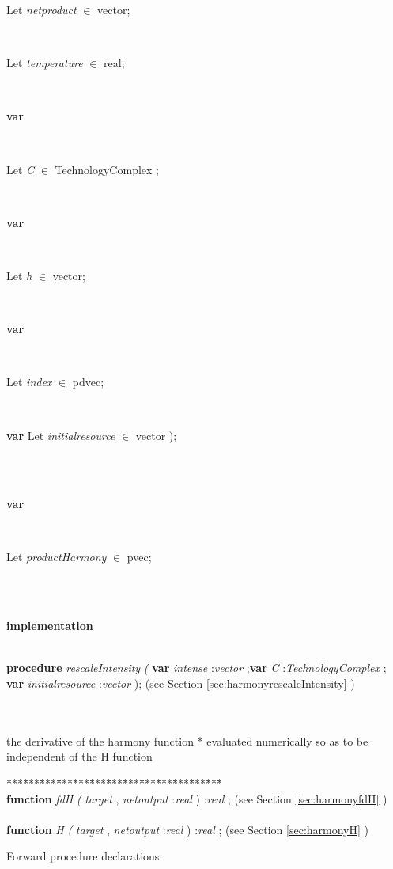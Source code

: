 \begin{tabbing}
\parbox{14cm}{\textsf{Let \textit{netproduct} $\in$ vector;}}\\
\parbox{14cm}{\textsf{Let \textit{temperature} $\in$ real;}}\\
\<\parbox{14cm}{\textsf{\textbf{var} }}\\
\parbox{14cm}{\textsf{Let \textit{C} $\in$ TechnologyComplex ;}}\\
\<\parbox{14cm}{\textsf{\textbf{var} }}\\
\parbox{14cm}{\textsf{Let \textit{h} $\in$ vector;}}\\
\<\parbox{14cm}{\textsf{\textbf{var} }}\\
\parbox{14cm}{\textsf{Let \textit{index} $\in$ pdvec;}}\\
\<\parbox{14cm}{\textsf {\textbf {var } \textsf{Let \textit{initialresource} $\in$ vector );}}}\\
\\
\<\parbox{14cm}{\textsf{\textbf{var} }}\\
\parbox{14cm}{\textsf{Let \textit{productHarmony} $\in$ pvec;}}\\
\\
\<\parbox{14cm}{\textsf{\textbf{implementation} }}\\
\<\textsf{\textbf{procedure}  \textit{rescaleIntensity} \textit{(} \textbf{var}  \textit{intense} :\textit{vector} ;\textbf{var}  \textit{C} :\textit{TechnologyComplex}  ; \textbf{var}  \textit{initialresource} :\textit{vector} );} (see Section \ref{sec:harmonyrescaleIntensity} )\\
\\
\\
\end{tabbing}
the derivative of the harmony function
* evaluated numerically so as to be independent of the H function
\begin{tabbing}
***\=***\=***\=***\=***\=***\=***\=***\=***\=***\=***\=***\=***\=\kill
\+ \+ \\
\<\textsf{\textbf{function}  \textit{fdH} \textit{(} \textit{target} ,  \textit{netoutput} :\textit{real} ) :\textit{real} ;} (see Section \ref{sec:harmonyfdH} )\\
\\
\<\textsf{\textbf{function}  \textit{H} \textit{(}  \textit{target} ,  \textit{netoutput} :\textit{real} ) :\textit{real} ;} (see Section \ref{sec:harmonyH} )\\
\end{tabbing}
Forward procedure declarations
